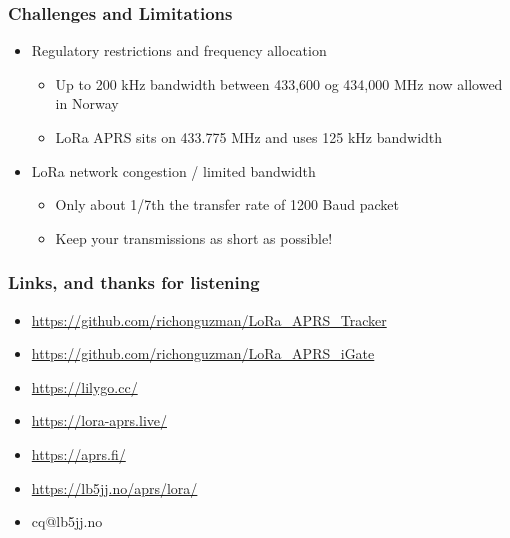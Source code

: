 \documentclass[aspectratio=169]{beamer}
\begin{document}
\begin{frame}[t]
  \frametitle{Challenges and Limitations}
  \begin{itemize}
    \item Regulatory restrictions and frequency allocation
    \medskip
    \begin{itemize}
      \item Up to 200 kHz bandwidth between 433,600 og 434,000 MHz now allowed in Norway
      \medskip
      \item LoRa APRS sits on 433.775 MHz and uses 125 kHz bandwidth
      \medskip
    \end{itemize}
    \item LoRa network congestion / limited bandwidth 
    \medskip
    \begin{itemize}
      \item Only about 1/7th the transfer rate of 1200 Baud packet
      \medskip
      \item Keep your transmissions as short as possible!
    \end{itemize}
  \end{itemize}
\end{frame}

\begin{frame}[t]
  \frametitle{Links, and thanks for listening}
    \begin{itemize}
      \item \url{https://github.com/richonguzman/LoRa_APRS_Tracker}
      \medskip
      \item \url{https://github.com/richonguzman/LoRa_APRS_iGate}
      \medskip
      \item \url{https://lilygo.cc/}
      \medskip
      \item \url{https://lora-aprs.live/}
      \medskip
      \item \url{https://aprs.fi/}
      \medskip
      \item \url{https://lb5jj.no/aprs/lora/}
      \medskip
      \item cq@lb5jj.no
  \end{itemize}
\end{frame}
\end{document}
